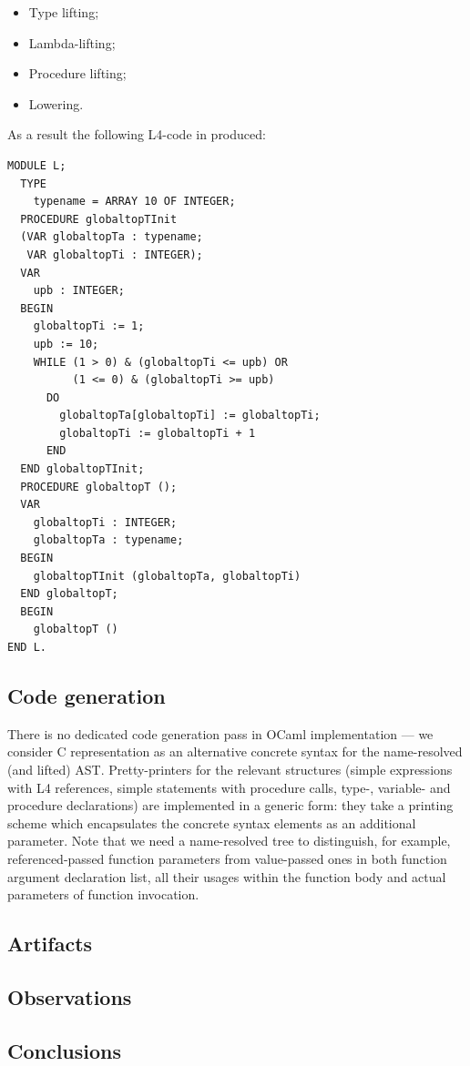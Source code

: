 \begin{itemize}
\item Type lifting;
\item Lambda-lifting;
\item Procedure lifting;
\item Lowering.
\end{itemize}

As a result the following L4-code in produced:

\begin{lstlisting}[language=oberon0]
MODULE L;
  TYPE
    typename = ARRAY 10 OF INTEGER;
  PROCEDURE globaltopTInit 
  (VAR globaltopTa : typename; 
   VAR globaltopTi : INTEGER);
  VAR
    upb : INTEGER;
  BEGIN
    globaltopTi := 1; 
    upb := 10; 
    WHILE (1 > 0) & (globaltopTi <= upb) OR 
          (1 <= 0) & (globaltopTi >= upb)
      DO
        globaltopTa[globaltopTi] := globaltopTi; 
        globaltopTi := globaltopTi + 1
      END
  END globaltopTInit;
  PROCEDURE globaltopT ();
  VAR
    globaltopTi : INTEGER;
    globaltopTa : typename;
  BEGIN
    globaltopTInit (globaltopTa, globaltopTi)
  END globaltopT;
  BEGIN
    globaltopT ()
END L.
\end{lstlisting}

\subsection{Code generation}

There is no dedicated code generation pass in OCaml implementation --- we consider C representation
as an alternative concrete syntax for the name-resolved (and lifted) AST. Pretty-printers for the relevant
structures (simple expressions with L4 references, simple statements with procedure calls, 
type-, variable- and procedure declarations) are implemented in a generic form: they take a
printing scheme which encapsulates the concrete syntax elements as an additional
parameter. Note that we need a name-resolved tree to distinguish, for example, referenced-passed
function parameters from value-passed ones in both function argument declaration list, all
their usages within the function body and actual parameters of function invocation.

\subsection{Artifacts}

\subsection{Observations}

\subsection{Conclusions}
